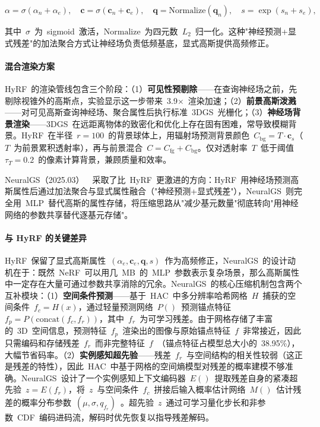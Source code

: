 \begin{equation}
\alpha = \sigma(\alpha_n + \alpha_e), \quad \mathbf{c} = \sigma(\mathbf{c}_n + \mathbf{c}_e), \quad \mathbf{q} = \text{Normalize}(\mathbf{q}_n), \quad s = \exp(s_n + s_e),
\end{equation}

其中~$\sigma$~为~sigmoid~激活，$\text{Normalize}$~为四元数~$L_2$~归一化。这种"神经预测+显式残差"的加法聚合方式让神经场负责低频基底，显式高斯提供高频修正。

\paragraph{混合渲染方案}

HyRF~的渲染管线包含三个阶段：（1）\textbf{可见性预剔除}——在查询神经场之前，先剔除视锥外的高斯点，实验显示这一步带来~3.9$\times$~渲染加速；（2）\textbf{前景高斯泼溅}——对可见高斯查询神经场、聚合属性后执行标准~3DGS~光栅化；（3）\textbf{神经场背景渲染}——3DGS~在远距离物体的致密化和优化上存在固有困难，常导致模糊背景。HyRF~在半径~$r=100$~的背景球体上，用辐射场预测背景颜色~$C_\text{bg} = T \cdot \mathbf{c}_s$（$T$~为前景累积透射率），再与前景混合~$C = C_\text{fg} + C_\text{bg}$。仅对透射率~$T$~低于阈值~$\tau_T=0.2$~的像素计算背景，兼顾质量和效率。

NeuralGS（2025.03）~\cite{2503_23337}~采取了比~HyRF~更激进的方向：HyRF~用神经场预测高斯属性后通过加法聚合与显式属性融合（"神经预测+显式残差"），NeuralGS~则完全用~MLP~替代高斯的属性存储，将压缩思路从"减少基元数量"彻底转向"用神经网络的参数共享替代逐基元存储"。

\paragraph{与 HyRF 的关键差异}

HyRF~保留了显式高斯属性~$(\alpha_e, \mathbf{c}_e, \mathbf{q}, s)$~作为高频修正，NeuralGS~的设计动机在于：既然~NeRF~可以用几~MB~的~MLP~参数表示复杂场景，那么高斯属性中一定存在大量可通过参数共享消除的冗余。NeuralGS~的核心压缩机制包含两个互补模块：（1）\textbf{空间条件预测}——基于~HAC~中多分辨率哈希网格~$H$~捕获的空间条件~$f_c = H(x)$，通过轻量预测网络~$P()$~预测锚点特征~$f_p = P(\text{concat}(f_c, f_r))$，其中~$f_r$~为可学习残差。由于网格存储了丰富的~3D~空间信息，预测特征~$f_p$~渲染出的图像与原始锚点特征~$f$~非常接近，因此只需编码和存储残差~$f_r$~而非完整特征~$f$~（锚点特征占模型总大小的~38.95\%），大幅节省码率。（2）\textbf{实例感知超先验}——残差~$f_r$~与空间结构的相关性较弱（这正是残差的特性），因此~HAC~中基于网格的空间熵模型对残差的概率建模不够准确。NeuralGS~设计了一个实例感知上下文编码器~$E()$~提取残差自身的紧凑超先验~$z = E(f_r)$，将~$z$~与空间条件~$f_c$~拼接后输入概率估计网络~$M()$~估计残差的概率分布参数~$(\mu, \sigma, q_{f_r})$~。超先验~$z$~通过可学习量化步长和非参数~CDF~编码进码流，解码时优先恢复以指导残差解码。

